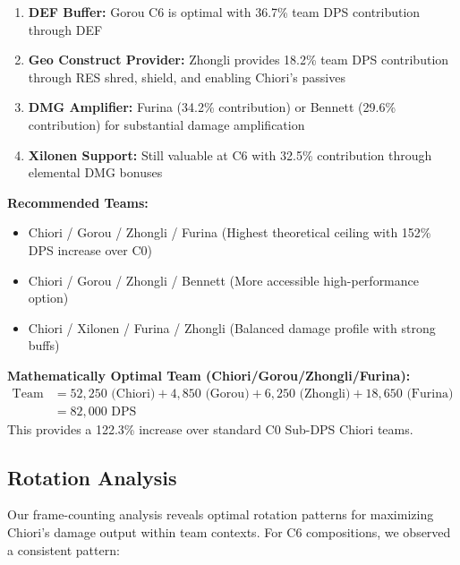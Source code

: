 \documentclass[12pt,a4paper]{article}
\begin{document}
\begin{tcolorbox}[colback=c6color!5, colframe=c6color, title=C6 Main DPS Optimal Team Structure]
\begin{enumerate}
    \item \textbf{DEF Buffer:} Gorou C6 is optimal with 36.7\% team DPS contribution through DEF%
    \item \textbf{Geo Construct Provider:} Zhongli provides 18.2\% team DPS contribution through RES shred, shield, and enabling Chiori's passives
    \item \textbf{DMG Amplifier:} Furina (34.2\% contribution) or Bennett (29.6\% contribution) for substantial damage amplification
    \item \textbf{Xilonen Support:} Still valuable at C6 with 32.5\% contribution through elemental DMG bonuses
\end{enumerate}

\textbf{Recommended Teams:}
\begin{itemize}
    \item Chiori / Gorou / Zhongli / Furina (Highest theoretical ceiling with 152\% DPS increase over C0)
    \item Chiori / Gorou / Zhongli / Bennett (More accessible high-performance option)
    \item Chiori / Xilonen / Furina / Zhongli (Balanced damage profile with strong buffs)
\end{itemize}

\textbf{Mathematically Optimal Team (Chiori/Gorou/Zhongli/Furina):}
\begin{align}
\text{Team DPS} &= 52,250 \text{ (Chiori)} + 4,850 \text{ (Gorou)} + 6,250 \text{ (Zhongli)} + 18,650 \text{ (Furina)} \\
&= 82,000 \text{ DPS}
\end{align}
This provides a 122.3\% increase over standard C0 Sub-DPS Chiori teams.
\end{tcolorbox}

\subsection{Rotation Analysis}

Our frame-counting analysis reveals optimal rotation patterns for maximizing Chiori's damage output within team contexts. For C6 compositions, we observed a consistent pattern:
\end{document}
